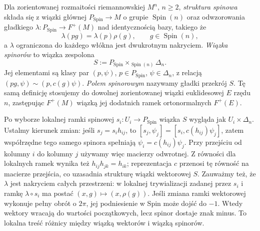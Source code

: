 \begin{definicja}
\label{def:struktura-spinowa}
Dla zorientowanej rozmaitości riemannowskiej
$M^n$, $n\geq2$, \emph{struktura spinowa}
składa się z wiązki głównej
$P_{\mathrm{Spin}}\to M$ o grupie
$\operatorname{Spin}(n)$ oraz odwzorowania
gładkiego $\lambda:P_{\mathrm{Spin}}\to F^+(M)$
nad identycznością bazy, takiego że
\[
 \lambda(pg)=\lambda(p)\rho(g),
 \qquad g\in\operatorname{Spin}(n),
\]
a $\lambda$ ograniczona do każdego włókna
jest dwukrotnym nakryciem.
\emph{Wiązka spinorów} to wiązka zespolona
\[
 S:=P_{\mathrm{Spin}}\times_{\operatorname{Spin}(n)}\Delta_n.
\]
Jej elementami są klasy par $(p,\psi)$,
$p\in P_{\mathrm{Spin}}$, $\psi\in\Delta_n$,
z relacją $(pg,\psi)\sim(p,c(g)\psi)$.
\emph{Polem spinorowym} nazywamy gładki przekrój $S$.
Tę samą definicję stosujemy do dowolnej zorientowanej wiązki
euklidesowej $E$ rzędu $n$, zastępując $F^+(M)$ wiązką jej
dodatnich ramek ortonormalnych $F^+(E)$.
\end{definicja}

Po wyborze lokalnej ramki spinowej $s_i:U_i\to P_{\mathrm{Spin}}$
wiązka $S$ wygląda jak $U_i\times\Delta_n$. Ustalmy kierunek
zmian: jeśli $s_j=s_i h_{ij}$, to
$[s_j,\psi_j]=[s_i,c(h_{ij})\psi_j]$, zatem współrzędne
tego samego spinora spełniają $\psi_i=c(h_{ij})\psi_j$.
Przy przejściu od kolumny $i$ do kolumny $j$ używamy więc
macierzy odwrotnej. Z równości dla lokalnych ramek wynika też
$h_{ij}h_{jk}=h_{ik}$; reprezentacja $c$ przenosi tę równość
na macierze przejścia, co uzasadnia strukturę wiązki wektorowej $S$.
Zauważmy też, że $\lambda$ jest nakryciem całych przestrzeni:
w lokalnej trywializacji zadanej przez $s_i$ i ramkę $\lambda\circ s_i$
ma postać $(x,g)\mapsto(x,\rho(g))$.
Jeśli zmiana ramki wektorowej wykonuje pełny
obrót o $2\pi$, jej podniesienie w Spin
może dojść do $-1$. Wtedy wektory wracają
do wartości początkowych, lecz spinor dostaje
znak minus. To lokalna treść różnicy między
wiązką wektorów i wiązką spinorów.

